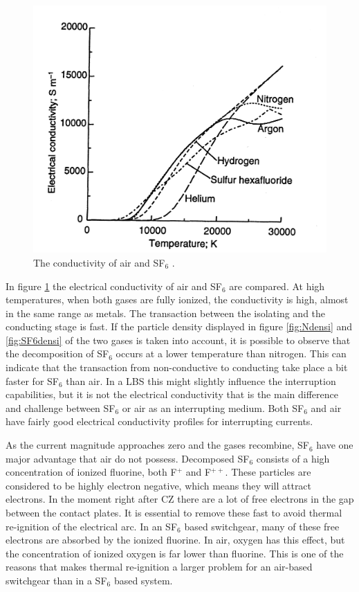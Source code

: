 \documentclass[10pt,a4paper,twoside]{article}
\begin{document}
\begin{figure}[H]
\centering
\includegraphics[scale=1]{Bilder/Discussion/conductSF6AndAIR.png}
\caption{The conductivity of air and SF${_6}$ \cite{bib:THFD}.} \label{fig:AirandSF6ConComp}
\end{figure}

In figure \ref{fig:AirandSF6ConComp} the electrical conductivity of air and SF$_6$ are compared. At high temperatures, when both gases are fully ionized, the conductivity is high, almost in the same range as metals. The transaction between the isolating and the conducting stage is fast. If the particle density displayed in figure \ref{fig:Ndensi} and \ref{fig:SF6densi} of the two gases is taken into account, it is possible to observe that the decomposition of SF$_6$ occurs at a lower temperature than nitrogen. This can indicate that the transaction from non-conductive to conducting take place a bit faster for SF$_6$ than air. In a LBS this might slightly influence the interruption capabilities, but it is not the electrical conductivity that is the main difference and challenge between SF$_6$ or air as an interrupting medium. Both SF$_6$ and air have fairly good electrical conductivity profiles for interrupting currents.

As the current magnitude approaches zero and the gases recombine, SF$_6$ have one major advantage that air do not possess. Decomposed SF$_6$ consists of a high concentration of ionized fluorine, both F$^{+}$ and F$^{++}$. These particles are considered to be highly electron negative, which means they will attract electrons. In the moment right after CZ there are a lot of free electrons in the gap between the contact plates. It is essential to remove these fast to avoid thermal re-ignition of the electrical arc. In an SF$_6$ based switchgear, many of these free electrons are absorbed by the ionized fluorine. In air, oxygen has this effect, but the concentration of ionized oxygen is far lower than fluorine. This is one of the reasons that makes thermal re-ignition a larger problem for an air-based switchgear than in a SF$_6$ based system.
\end{document}
